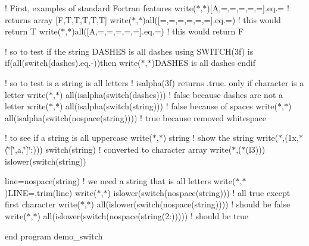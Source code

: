 ! First, examples of standard Fortran features write($\ast$,$\ast$)\mbox{[}\textquotesingle{}A\textquotesingle{},\textquotesingle{}=\textquotesingle{},\textquotesingle{}=\textquotesingle{},\textquotesingle{}=\textquotesingle{},\textquotesingle{}=\textquotesingle{},\textquotesingle{}=\textquotesingle{}\mbox{]}.eq.\textquotesingle{}=\textquotesingle{} ! returns array \mbox{[}F,T,T,T,T,T\mbox{]} write($\ast$,$\ast$)all(\mbox{[}\textquotesingle{}=\textquotesingle{},\textquotesingle{}=\textquotesingle{},\textquotesingle{}=\textquotesingle{},\textquotesingle{}=\textquotesingle{},\textquotesingle{}=\textquotesingle{},\textquotesingle{}=\textquotesingle{}\mbox{]}.eq.\textquotesingle{}=\textquotesingle{}) ! this would return T write($\ast$,$\ast$)all(\mbox{[}\textquotesingle{}A\textquotesingle{},\textquotesingle{}=\textquotesingle{},\textquotesingle{}=\textquotesingle{},\textquotesingle{}=\textquotesingle{},\textquotesingle{}=\textquotesingle{},\textquotesingle{}=\textquotesingle{}\mbox{]}.eq.\textquotesingle{}=\textquotesingle{}) ! this would return F

! so to test if the string D\+A\+S\+H\+ES is all dashes using S\+W\+I\+T\+C\+H(3f) is if(all(switch(dashes).eq.\textquotesingle{}-\/\textquotesingle{}))then write($\ast$,$\ast$)\textquotesingle{}D\+A\+S\+H\+ES is all dashes\textquotesingle{} endif

! so to test is a string is all letters ! isalpha(3f) returns .true. only if character is a letter write($\ast$,$\ast$) all(isalpha(switch(dashes))) ! false because dashes are not a letter write($\ast$,$\ast$) all(isalpha(switch(string))) ! false because of spaces write($\ast$,$\ast$) all(isalpha(switch(nospace(string)))) ! true because removed whitespace

! to see if a string is all uppercase write($\ast$,$\ast$) string ! show the string write($\ast$,\textquotesingle{}(1x,$\ast$(\char`\"{}\mbox{[}\char`\"{},a,\char`\"{}\mbox{]}\char`\"{}\+:))\textquotesingle{}) switch(string) ! converted to character array write($\ast$,\textquotesingle{}($\ast$(l3))\textquotesingle{}) islower(switch(string))

line=nospace(string) ! we need a string that is all letters write($\ast$,$\ast$)\textquotesingle{}L\+I\+NE=\textquotesingle{},trim(line) write($\ast$,$\ast$) islower(switch(nospace(string))) ! all true except first character write($\ast$,$\ast$) all(islower(switch(nospace(string)))) ! should be false write($\ast$,$\ast$) all(islower(switch(nospace(string(2\+:))))) ! should be true

end program demo\+\_\+switch

